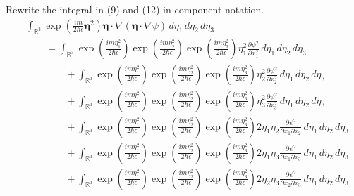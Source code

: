 \documentclass[12pt]{article}
\begin{document}
Rewrite the integral in (9) and (12) in component notation.
\begin{align*}
&\int_{\mathbb R^3}
\exp\left(\frac{im}{2\hbar\epsilon}\boldsymbol\eta^2\right)
\boldsymbol\eta\cdot\nabla(\boldsymbol\eta\cdot\nabla\psi)
\,d\eta_1\,d\eta_2\,d\eta_3
\\
&\qquad{}=\int_{\mathbb R^3}
\exp\left(\frac{im\eta_1^2}{2\hbar\epsilon}\right)
\exp\left(\frac{im\eta_2^2}{2\hbar\epsilon}\right)
\exp\left(\frac{im\eta_3^2}{2\hbar\epsilon}\right)
\eta_1^2\frac{\partial\psi^2}{\partial x_1^2}
\,d\eta_1\,d\eta_2\,d\eta_3
\\
&\qquad\qquad{}+\int_{\mathbb R^3}
\exp\left(\frac{im\eta_1^2}{2\hbar\epsilon}\right)
\exp\left(\frac{im\eta_2^2}{2\hbar\epsilon}\right)
\exp\left(\frac{im\eta_3^2}{2\hbar\epsilon}\right)
\eta_2^2\frac{\partial\psi^2}{\partial x_2^2}
\,d\eta_1\,d\eta_2\,d\eta_3
\\
&\qquad\qquad{}+\int_{\mathbb R^3}
\exp\left(\frac{im\eta_1^2}{2\hbar\epsilon}\right)
\exp\left(\frac{im\eta_2^2}{2\hbar\epsilon}\right)
\exp\left(\frac{im\eta_3^2}{2\hbar\epsilon}\right)
\eta_3^2\frac{\partial\psi^2}{\partial x_3^2}
\,d\eta_1\,d\eta_2\,d\eta_3
\\
&\qquad\qquad{}+\int_{\mathbb R^3}
\exp\left(\frac{im\eta_1^2}{2\hbar\epsilon}\right)
\exp\left(\frac{im\eta_2^2}{2\hbar\epsilon}\right)
\exp\left(\frac{im\eta_3^2}{2\hbar\epsilon}\right)
2\eta_1\eta_2\frac{\partial\psi^2}{\partial x_1\partial x_2}
\,d\eta_1\,d\eta_2\,d\eta_3
\\
&\qquad\qquad{}+\int_{\mathbb R^3}
\exp\left(\frac{im\eta_1^2}{2\hbar\epsilon}\right)
\exp\left(\frac{im\eta_2^2}{2\hbar\epsilon}\right)
\exp\left(\frac{im\eta_3^2}{2\hbar\epsilon}\right)
2\eta_1\eta_3\frac{\partial\psi^2}{\partial x_1\partial x_3}
\,d\eta_1\,d\eta_2\,d\eta_3
\\
&\qquad\qquad{}+\int_{\mathbb R^3}
\exp\left(\frac{im\eta_1^2}{2\hbar\epsilon}\right)
\exp\left(\frac{im\eta_2^2}{2\hbar\epsilon}\right)
\exp\left(\frac{im\eta_3^2}{2\hbar\epsilon}\right)
2\eta_2\eta_3\frac{\partial\psi^2}{\partial x_2\partial x_3}
\,d\eta_1\,d\eta_2\,d\eta_3
\end{align*}
\end{document}
